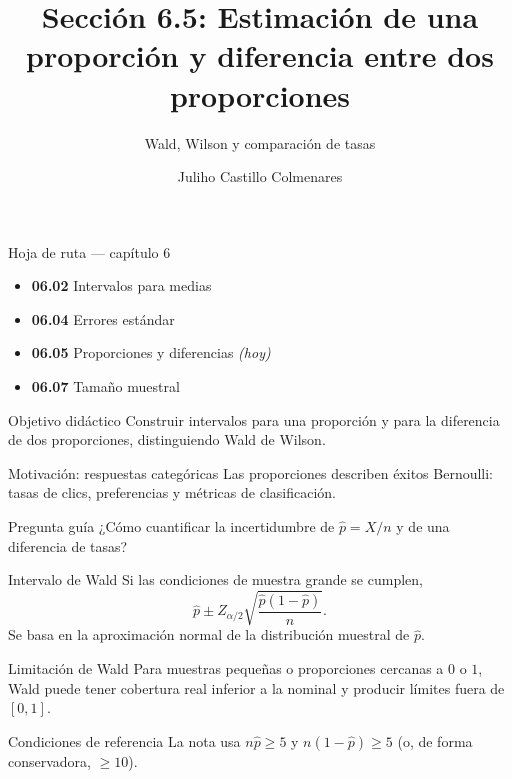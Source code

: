\documentclass[10pt,aspectratio=169]{beamer}
\title[Estimación de proporciones]{Sección 6.5: Estimación de una proporción y diferencia entre dos proporciones}
\subtitle{Wald, Wilson y comparación de tasas}
\author[J. Castillo Colmenares]{Juliho Castillo Colmenares}
\institute{Tecnológico de Monterrey}
\date{}
\begin{document}
\begin{frame}[plain]\vspace{-0.8cm}\titlepage\end{frame}

\begin{frame}{Hoja de ruta --- capítulo 6}
  \footnotesize
  \begin{itemize}\itemsep=0.08cm
    \item \textbf{06.02} Intervalos para medias
    \item \textbf{06.04} Errores estándar
    \item \textbf{06.05} Proporciones y diferencias \emph{(hoy)}
    \item \textbf{06.07} Tamaño muestral
  \end{itemize}
  \begin{block}{Objetivo didáctico}
    Construir intervalos para una proporción y para la diferencia de dos
    proporciones, distinguiendo Wald de Wilson.
  \end{block}
\end{frame}

\begin{frame}{Motivación: respuestas categóricas}
  \footnotesize
  Las proporciones describen éxitos Bernoulli: tasas de clics, preferencias y
  métricas de clasificación.
  \begin{alertblock}{Pregunta guía}
    ¿Cómo cuantificar la incertidumbre de $\hat p=X/n$ y de una diferencia de
    tasas?
  \end{alertblock}
\end{frame}

\begin{frame}{Intervalo de Wald}
  \footnotesize
  Si las condiciones de muestra grande se cumplen,
  \[
    \hat p\pm Z_{\alpha/2}\sqrt{\frac{\hat p(1-\hat p)}{n}}.
  \]
  Se basa en la aproximación normal de la distribución muestral de $\hat p$.
\end{frame}

\begin{frame}{Limitación de Wald}
  \footnotesize
  Para muestras pequeñas o proporciones cercanas a $0$ o $1$, Wald puede tener
  cobertura real inferior a la nominal y producir límites fuera de $[0,1]$.
  \begin{block}{Condiciones de referencia}
    La nota usa $n\hat p\ge5$ y $n(1-\hat p)\ge5$ (o, de forma conservadora,
    $\ge10$).
  \end{block}
\end{frame}
\end{document}
